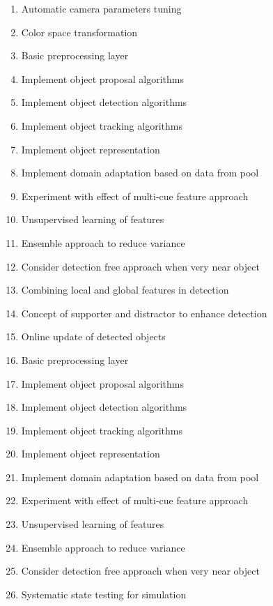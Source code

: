 \begin{enumerate}
    \item Automatic camera parameters tuning
    \item Color space transformation 
    \item Basic preprocessing layer
    \item Implement object proposal algorithms
    \item Implement object detection algorithms
    \item Implement object tracking algorithms
    \item Implement object representation
    \item Implement domain adaptation based on data from pool
    \item Experiment with effect of multi-cue feature approach
    \item Unsupervised learning of features
    \item Ensemble approach to reduce variance
    \item Consider detection free approach when very near object
    \item Combining local and global features in detection
    \item Concept of supporter and distractor to enhance detection
    \item Online update of detected objects
    \item Basic preprocessing layer
    \item Implement object proposal algorithms
    \item Implement object detection algorithms
    \item Implement object tracking algorithms
    \item Implement object representation
    \item Implement domain adaptation based on data from pool
    \item Experiment with effect of multi-cue feature approach
    \item Unsupervised learning of features
    \item Ensemble approach to reduce variance
    \item Consider detection free approach when very near object
    \item Systematic state testing for simulation
\end{enumerate}
